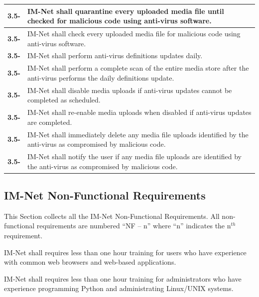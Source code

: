 \documentclass[letterpaper,12pt]{article}
\newcounter{qcounter}							%
\newcounter{rcounter}							%
\newcommand\rnumber{\stepcounter{rcounter}\arabic{rcounter}}
\begin{document}
{\begin{center}
\begin{tabular}{|l|p{6in}|}
\hline
\textbf{3.5-\rnumber} & IM-Net shall quarantine every uploaded media file until checked for malicious code using anti-virus software. \\ 
\hline
\textbf{3.5-\rnumber} & IM-Net shall check every uploaded media file for malicious code using anti-virus software. \\ 
\hline
\textbf{3.5-\rnumber} & IM-Net shall perform anti-virus definitions updates daily.\\ 
\hline
\textbf{3.5-\rnumber} & IM-Net shall perform a complete scan of the entire media store after the anti-virus performs the daily definitions update.\\ 
\hline
\textbf{3.5-\rnumber} & IM-Net shall disable media uploads if anti-virus updates cannot be completed as scheduled. \\ 
\hline 
\textbf{3.5-\rnumber} & IM-Net shall re-enable media uploads when disabled if anti-virus updates are completed. \\ 
\hline
\textbf{3.5-\rnumber} & IM-Net shall immediately delete any media file uploads identified by the anti-virus as compromised by malicious code. \\ 
\hline
\textbf{3.5-\rnumber} & IM-Net shall notify the user if any media file uploads are identified by the anti-virus as compromised by malicious code. \\ 
\hline
\end{tabular} 
\end{center}

\textcolor{subsection}{\subsection{IM-Net Non-Functional Requirements}}

This Section collects all the IM-Net Non-Functional Requirements. All non-functional requirements are numbered ``NF -- n'' where ``n'' indicates the n${}^{th}$ requirement.

\begin{list}{NF -- :~}{}

\item  IM-Net shall requires less than one hour training for users who have experience with common web browsers and web-based applications.

\item  IM-Net shall requires less than one hour training for administrators who have experience programming Python and administrating Linux/UNIX systems.


\end{list}}
\end{document}
